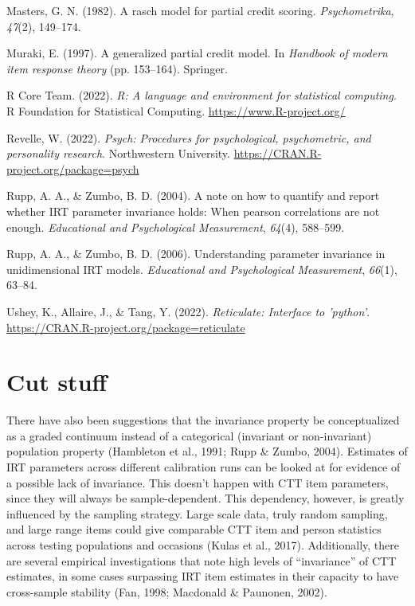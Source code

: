 \documentclass[
  man]{apa6}
\newlength{\cslhangindent}
\newlength{\cslentryspacingunit} %
\newenvironment{CSLReferences}[2] %
 {%
  \setlength{\parindent}{0pt}
  \ifodd #1
  \let\oldpar\par
  \def\par{\hangindent=\cslhangindent\oldpar}
  \fi
  \setlength{\parskip}{#2\cslentryspacingunit}
 }%
 {}
\begin{document}
\begin{CSLReferences}{1}{0}
\leavevmode{}%
Masters, G. N. (1982). A rasch model for partial credit scoring. \emph{Psychometrika}, \emph{47}(2), 149--174.

\leavevmode{}%
Muraki, E. (1997). A generalized partial credit model. In \emph{Handbook of modern item response theory} (pp. 153--164). Springer.

\leavevmode{}%
R Core Team. (2022). \emph{R: A language and environment for statistical computing}. R Foundation for Statistical Computing. \url{https://www.R-project.org/}

\leavevmode{}%
Revelle, W. (2022). \emph{Psych: Procedures for psychological, psychometric, and personality research}. Northwestern University. \url{https://CRAN.R-project.org/package=psych}

\leavevmode{}%
Rupp, A. A., \& Zumbo, B. D. (2004). A note on how to quantify and report whether IRT parameter invariance holds: When pearson correlations are not enough. \emph{Educational and Psychological Measurement}, \emph{64}(4), 588--599.

\leavevmode{}%
Rupp, A. A., \& Zumbo, B. D. (2006). Understanding parameter invariance in unidimensional IRT models. \emph{Educational and Psychological Measurement}, \emph{66}(1), 63--84.

\leavevmode{}%
Ushey, K., Allaire, J., \& Tang, Y. (2022). \emph{Reticulate: Interface to 'python'}. \url{https://CRAN.R-project.org/package=reticulate}

\end{CSLReferences}

\endgroup

\hypertarget{appendix-appendices}{%
\appendix}


\hypertarget{cut-stuff}{%
\section{Cut stuff}\label{cut-stuff}}

There have also been suggestions that the invariance property be conceptualized as a graded continuum instead of a categorical (invariant or non-invariant) population property (Hambleton et al., 1991; Rupp \& Zumbo, 2004). Estimates of IRT parameters across different calibration runs can be looked at for evidence of a possible lack of invariance. This doesn't happen with CTT item parameters, since they will always be sample-dependent. This dependency, however, is greatly influenced by the sampling strategy. Large scale data, truly random sampling, and large range items could give comparable CTT item and person statistics across testing populations and occasions (Kulas et al., 2017). Additionally, there are several empirical investigations that note high levels of ``invariance'' of CTT estimates, in some cases surpassing IRT item estimates in their capacity to have cross-sample stability (Fan, 1998; Macdonald \& Paunonen, 2002).
\end{document}
